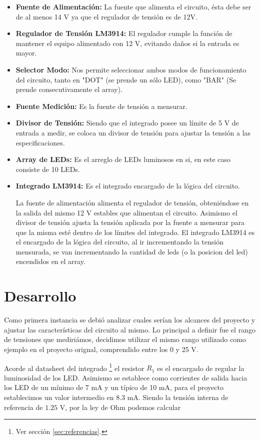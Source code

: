 \documentclass[12pt,a4paper]{article}
\begin{document}
	\begin{itemize}
		\item \textbf{Fuente de Alimentación:} La fuente que alimenta el circuito, ésta debe ser de al menos 14 V ya que el regulador de tensión es de 12V.
		\item \textbf{Regulador de Tensión LM3914:} El regulador cumple la función de mantener el equipo alimentado con 12 V, evitando daños si la entrada es mayor.
		\item \textbf{Selector Modo:} Nos permite seleccionar ambos modos de funcionamiento del circuito, tanto en "DOT" (se prende un sólo LED), como "BAR" (Se prende consecutivamente el array).
		\item \textbf{Fuente Medición:} Es la fuente de tensión a mensurar.
		\item \textbf{Divisor de Tensión:} Siendo que el integrado posee un límite de 5 V de entrada a medir, se coloca un divisor de tensión para ajustar la tensión a las especificaciones.
		\item \textbf{Array de LEDs:} Es el arreglo de LEDs luminosos en si, en este caso consiste de 10 LEDs.
		\item \textbf{Integrado LM3914: } Es el integrado encargado de la lógica del circuito.

		La fuente de alimentación alimenta el regulador de tensión, obteniéndose en la salida del mismo 12 V estables que alimentan el circuito. Asimismo el divisor de tensión ajusta la tensión aplicada por la fuente a mensurar para que la misma esté dentro de los límites del integrado. El integrado LM3914 es el encargado de la lógica del circuito, al ir incrementando la tensión mensurada, se van incrementando la cantidad de leds (o la posicion del led) encendidos en el array.
	\end{itemize}

	\section{Desarrollo}
		Como primera instancia se debió analizar cuales serían los alcances del proyecto y ajustar las características del circuito al mismo. Lo principal a definir fue el rango de tensiones que mediriámos, decidimos utilizar el mismo rango utilizado como ejemplo en el proyecto orignal, comprendido entre los 0 y 25 V.

		Acorde al datasheet del integrado \footnote{Ver sección \ref{sec:referencias}.} el resistor $R_1$ es el encargado de regular la luminosidad de los LED. Asimismo se establece como corrientes de salida hacia los LED de un mínimo de 7 mA y un típico de 10 mA, para el proyecto establecimos un valor intermedio en $8.3$ mA. Siendo la tensión interna de referencia de $1.25$ V, por la ley de Ohm podemos calcular
\end{document}
